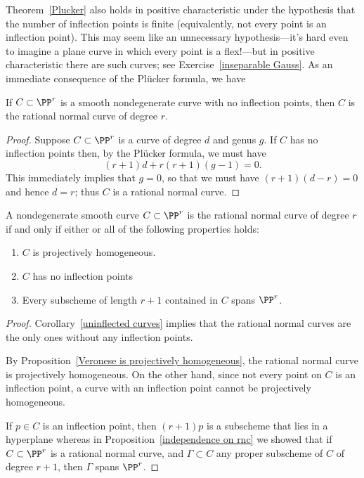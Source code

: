 Theorem~\ref{Plucker} also holds in positive characteristic under the hypothesis that the number of inflection points is finite (equivalently, not every point is an inflection point). This may seem like an unnecessary hypothesis---it's hard even to imagine a plane curve in which every point is a flex!---but in positive characteristic there are such curves; see Exercise~\ref{inseparable Gauss}.
As an immediate consequence of the Pl\"ucker formula, we have

\begin{corollary}\label{uninflected curves}
 If $C\subset \PP^r$ is a smooth nondegenerate curve with no inflection points, then $C$ is the rational normal curve of degree $r$. 
\end{corollary}

\begin{proof}
Suppose $C \subset \PP^r$ is a curve of degree $d$ and genus $g$. If $C$ has no inflection points then, by the Pl\"ucker formula, we must have
$$
(r+1)d + r(r+1)(g-1) = 0.
$$
This immediately implies that $g=0$, so that we must have $(r+1)(d-r) = 0$ and hence $d=r$; thus $C$ is a rational normal curve.
\end{proof}

\begin{corollary}
A nondegenerate smooth  curve $C\subset \PP^{r}$ is the rational normal curve
of degree $r$ if and only if either or all of the following properties holds:
\begin{enumerate}
 \item $C$ is projectively homogeneous.
 \item $C$ has no inflection points
 \item Every subscheme of length $r+1$ contained in $C$ spans $\PP^{r}$.
\end{enumerate}
\end{corollary}

\begin{proof}
Corollary~\ref{uninflected curves} implies that the
rational normal curves are the only ones without any inflection points.

By Proposition~\ref{Veronese is projectively homogeneous}, the rational normal curve 
is projectively homogeneous. On the other hand, since not every point on $C$ is an inflection point, a curve with an inflection point cannot be projectively homogeneous.

If $p \in C$ is an inflection point, then $(r+1)p$ is  a subscheme that lies in a hyperplane
whereas in Proposition~\ref{independence on rnc} we showed that if $C \subset \PP^r$ is a rational normal curve, and $\Gamma \subset C$ any proper subscheme of $C$ of degree $r+1$, then $\Gamma$ spans $\PP^r$. 
\end{proof}

